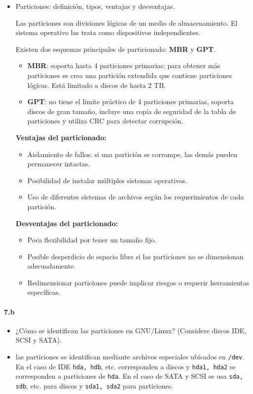 \documentclass[10pt,a4paper]{paper}
\begin{document}
	\begin{itemize}
		
		\item Particiones: definición, tipos, ventajas y desventajas.
		
		Las particiones son divisiones lógicas de un medio de almacenamiento. El
		sistema operativo las trata como dispositivos independientes.
		
		Existen dos esquemas principales de particionado: \textbf{MBR} y \textbf{GPT}.
		\begin{itemize}
			\item \textbf{MBR}: soporta hasta 4 particiones primarias; para obtener más
			particiones se crea una partición extendida que contiene particiones lógicas.
			Está limitado a discos de hasta 2 TB.
			\item \textbf{GPT}: no tiene el límite práctico de 4 particiones primarias,
			soporta discos de gran tamaño, incluye una copia de seguridad de la tabla de
			particiones y utiliza CRC para detectar corrupción.
		\end{itemize}
		
		\textbf{Ventajas del particionado:}
		\begin{itemize}
			\item Aislamiento de fallos: si una partición se corrompe, las demás pueden
			permanecer intactas.
			\item Posibilidad de instalar múltiples sistemas operativos.
			\item Uso de diferentes sistemas de archivos según los requerimientos de cada
			partición.
		\end{itemize}
		
		\textbf{Desventajas del particionado:}
		\begin{itemize}
			\item Poca flexibilidad por tener un tamaño fijo.
			\item Posible desperdicio de espacio libre si las particiones no se
			dimensionan adecuadamente.
			\item Redimensionar particiones puede implicar riesgos o requerir herramientas
			específicas.
		\end{itemize}
		
	\end{itemize}
	
	\paragraph{7.b}
	\begin{itemize}
		\item ¿Cómo se identifican las particiones en GNU/Linux? (Considere discos IDE,
		SCSI	y SATA).
		
		\item las particiones se identifican mediante archivos especiales ubicados en
		\texttt{/dev}. En el caso de IDE \texttt{hda, hdb}, etc. corresponden a discos y
		\texttt{hda1, hda2} se corresponden a particiones de \texttt{hda}. En el caso de
		SATA y SCSI se usa \texttt{sda, sdb}, etc. para discos y \texttt{sda1, sda2}
		para particiones.
	\end{itemize}
	
\end{document}

